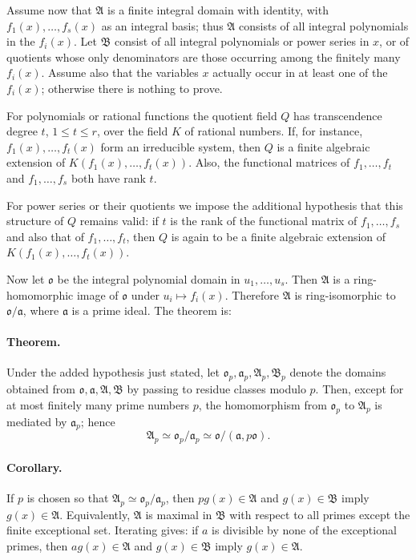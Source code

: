 \documentclass[11pt]{article}
\providecommand{\frakA}{\mathfrak A}
\providecommand{\frakB}{\mathfrak B}
\providecommand{\frako}{\mathfrak o}
\providecommand{\fraka}{\mathfrak a}
\begin{document}
Assume now that \(\frakA\) is a finite integral domain with identity, with \(f_1(x),\ldots,f_s(x)\) as an integral basis; thus \(\frakA\) consists of all integral polynomials in the \(f_i(x)\). Let \(\frakB\) consist of all integral polynomials or power series in \(x\), or of quotients whose only denominators are those occurring among the finitely many \(f_i(x)\). Assume also that the variables \(x\) actually occur in at least one of the \(f_i(x)\); otherwise there is nothing to prove.

For polynomials or rational functions the quotient field \(Q\) has transcendence degree \(t\), \(1\le t\le r\), over the field \(K\) of rational numbers. If, for instance, \(f_1(x),\ldots,f_t(x)\) form an irreducible system, then \(Q\) is a finite algebraic extension of \(K(f_1(x),\ldots,f_t(x))\). Also, the functional matrices of \(f_1,\ldots,f_t\) and \(f_1,\ldots,f_s\) both have rank \(t\).

For power series or their quotients we impose the additional hypothesis that this structure of \(Q\) remains valid: if \(t\) is the rank of the functional matrix of \(f_1,\ldots,f_s\) and also that of \(f_1,\ldots,f_t\), then \(Q\) is again to be a finite algebraic extension of \(K(f_1(x),\ldots,f_t(x))\).

Now let \(\frako\) be the integral polynomial domain in \(u_1,\ldots,u_s\). Then \(\frakA\) is a ring-homomorphic image of \(\frako\) under \(u_i\mapsto f_i(x)\). Therefore \(\frakA\) is ring-isomorphic to \(\frako/\fraka\), where \(\fraka\) is a prime ideal. The theorem is:

\paragraph{Theorem.}
Under the added hypothesis just stated, let \(\frako_p,\fraka_p,\frakA_p,\frakB_p\) denote the domains obtained from \(\frako,\fraka,\frakA,\frakB\) by passing to residue classes modulo \(p\). Then, except for at most finitely many prime numbers \(p\), the homomorphism from \(\frako_p\) to \(\frakA_p\) is mediated by \(\fraka_p\); hence
\[
        \frakA_p\simeq \frako_p/\fraka_p
        \simeq \frako/(\fraka,p\frako).
\]

\paragraph{Corollary.}
If \(p\) is chosen so that \(\frakA_p\simeq \frako_p/\fraka_p\), then \(p g(x)\in\frakA\) and \(g(x)\in\frakB\) imply \(g(x)\in\frakA\). Equivalently, \(\frakA\) is maximal in \(\frakB\) with respect to all primes except the finite exceptional set. Iterating gives: if \(a\) is divisible by none of the exceptional primes, then \(a g(x)\in\frakA\) and \(g(x)\in\frakB\) imply \(g(x)\in\frakA\).
\end{document}
